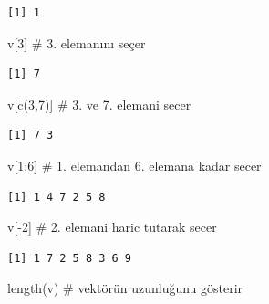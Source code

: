 \documentclass[
  letterpaper,
  DIV=11,
  numbers=noendperiod]{scrreprt}
\newenvironment{Shaded}{\begin{snugshade}}{\end{snugshade}}
\newcommand{\CommentTok}[1]{\textcolor[rgb]{0.37,0.37,0.37}{#1}}
\newcommand{\DecValTok}[1]{\textcolor[rgb]{0.68,0.00,0.00}{#1}}
\newcommand{\FunctionTok}[1]{\textcolor[rgb]{0.28,0.35,0.67}{#1}}
\newcommand{\NormalTok}[1]{\textcolor[rgb]{0.00,0.23,0.31}{#1}}
\newcommand{\SpecialCharTok}[1]{\textcolor[rgb]{0.37,0.37,0.37}{#1}}
\begin{document}
\begin{verbatim}
[1] 1
\end{verbatim}

\begin{Shaded}
\begin{Highlighting}[]
\NormalTok{v[}\DecValTok{3}\NormalTok{] }\CommentTok{\# 3. elemanını seçer}
\end{Highlighting}
\end{Shaded}

\begin{verbatim}
[1] 7
\end{verbatim}

\begin{Shaded}
\begin{Highlighting}[]
\NormalTok{v[}\FunctionTok{c}\NormalTok{(}\DecValTok{3}\NormalTok{,}\DecValTok{7}\NormalTok{)] }\CommentTok{\# 3. ve 7. elemani secer}
\end{Highlighting}
\end{Shaded}

\begin{verbatim}
[1] 7 3
\end{verbatim}

\begin{Shaded}
\begin{Highlighting}[]
\NormalTok{v[}\DecValTok{1}\SpecialCharTok{:}\DecValTok{6}\NormalTok{] }\CommentTok{\# 1. elemandan 6. elemana kadar secer}
\end{Highlighting}
\end{Shaded}

\begin{verbatim}
[1] 1 4 7 2 5 8
\end{verbatim}

\begin{Shaded}
\begin{Highlighting}[]
\NormalTok{v[}\SpecialCharTok{{-}}\DecValTok{2}\NormalTok{] }\CommentTok{\# 2. elemani haric tutarak secer}
\end{Highlighting}
\end{Shaded}

\begin{verbatim}
[1] 1 7 2 5 8 3 6 9
\end{verbatim}

\begin{Shaded}
\begin{Highlighting}[]
\FunctionTok{length}\NormalTok{(v) }\CommentTok{\# vektörün uzunluğunu gösterir}
\end{Highlighting}
\end{Shaded}
\end{document}
